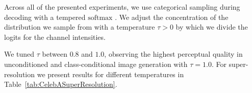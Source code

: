 Across all of the presented experiments, we use categorical sampling during decoding with a tempered $\mathrm{softmax}$ \citep{PixelRecursiveSuperResolution}. We adjust the concentration of the distribution we sample from with a temperature $\tau > 0$ by which we divide the logits for the channel intensities.

We tuned $\tau$ between $0.8$ and $1.0$, observing the highest perceptual quality in unconditioned and class-conditional image generation with  $\tau=1.0$.
For super-resolution we present results for different temperatures in Table~\ref{tab:CelebASuperResolution}.
